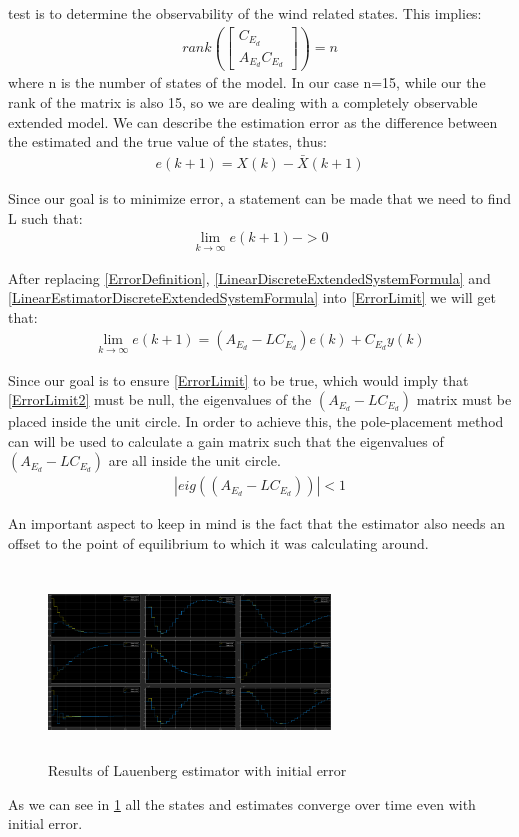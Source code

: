 \documentclass[twocolumn,showpacs,
    nofootinbib,aps,superscriptaddress,
    eqsecnum,prd,showkeys,10pt,floatfix]{revtex4}
\begin{document}
test is to determine the observability of the wind related states. This
implies:
\begin{align}
    rank(\begin{bmatrix}
             C_{E_d} \\
             A_{E_d}C_{E_d}
         \end{bmatrix})=n
\end{align}
where n is the number of states of the model.
In our case n=15, while our the rank of the matrix is also 15, so we are dealing with a completely observable extended model.
We can describe the estimation error as the difference between the estimated and the true value of the states, thus:
\begin{align}
    {e}(k+1)={X}(k)-\bar{X}(k+1)
    \label{ErrorDefinition}
\end{align}
\par
Since our goal is to minimize error, a statement can be made that we need to
find L such that:
\begin{align}
    \lim_{k \to \infty}  {e}(k+1)->0
    \label{ErrorLimit}
\end{align}
\par
After replacing {\ref{ErrorDefinition}},
{\ref{LinearDiscreteExtendedSystemFormula}} and
    {\ref{LinearEstimatorDiscreteExtendedSystemFormula}} into {\ref{ErrorLimit}} we
will get that:
\begin{align}
    \lim_{k \to \infty}  {e}(k+1)=(A_{E_d}-LC_{E_d}){e}(k)+C_{E_d}y(k)
    \label{ErrorLimit2}
\end{align}
\par
Since our goal is to ensure {\ref{ErrorLimit}} to be true, which would imply that {\ref{ErrorLimit2}} must
be null, the eigenvalues of the $(A_{E_d}-LC_{E_d})$ matrix 
must be placed inside the unit circle. In order to achieve
this, the pole-placement method can will be used to calculate a gain
matrix such that the eigenvalues of $(A_{E_d}-LC_{E_d})$ are all inside the
unit circle.
\begin{align}
    |eig((A_{E_d}-LC_{E_d}))|<1
    \label{EigenValuesEstimatorLauenBerg}
\end{align}
\par
An important aspect to keep in mind is the fact that the estimator also needs
an offset to the point of equilibrium to which it was calculating around.
\begin{figure} [h]
    \includegraphics[width=75mm,height=50mm]{SIMULINK2.PNG}
    \caption{Results of Lauenberg estimator with initial error}\label{fig:SIMULINK2}
\end{figure}
As we can see in {\ref{fig:SIMULINK2}} all the states and estimates converge over time even with initial error.
\end{document}
